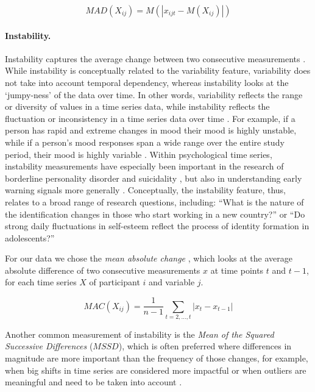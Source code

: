 \documentclass[man, 12pt, a4paper, floatsintext]{apa7}
\theoremstyle{break}
\theoremstyle{plain}
\begin{document}
\begin{equation} \label{eq:mad}
  MAD(X_{ij}) = M(\left| x_{ijt} - M(X_{ij}) \right|)
\end{equation}

\paragraph{Instability.}

Instability captures the average change between two consecutive
measurements \citep{ebner-priemer2009}. While instability is
conceptually related to the variability feature, variability does not
take into account temporal dependency, whereas instability looks at the
`jumpy-ness' of the data over time. In other words, variability reflects
the range or diversity of values in a time series data, while
instability reflects the fluctuation or inconsistency in a time series
data over time \citep{trull2008}. For example, if a person has rapid and
extreme changes in mood their mood is highly unstable, while if a
person's mood responses span a wide range over the entire study period,
their mood is highly variable \citep{jahng2008}. Within psychological
time series, instability measurements have especially been important in
the research of borderline personality disorder \citep{trull2008} and
suicidality \citep{kivela2022}, but also in understanding early warning
signals more generally \citep{wichers2019}. Conceptually, the
instability feature, thus, relates to a broad range of research
questions, including: ``What is the nature of the identification changes
in those who start working in a new country?'' or ``Do strong daily
fluctuations in self-esteem reflect the process of identity formation in
adolescents?''

For our data we chose the \textit{mean absolute change}
\citep[$MAC$; e.g.,][]{ebner-priemer2009, barandas2020}, which looks at
the average absolute difference of two consecutive measurements \(x\) at
time points \(t\) and \(t-1\), for each time series \(X\) of participant
\(i\) and variable \(j\).

\begin{equation} \label{eq:mac}
  MAC(X_{ij}) = \frac{1}{n-1} \sum_{t=2, \ldots, t}\left|x_{t}-x_{t-1}\right|
\end{equation}

Another common measurement of instability is the
\textit{Mean of the Squared Successive Differences} (\(MSSD\)), which is
often preferred where differences in magnitude are more important than
the frequency of those changes, for example, when big shifts in time
series are considered more impactful or when outliers are meaningful and
need to be taken into account \citep{chatfield2003}.
\end{document}
